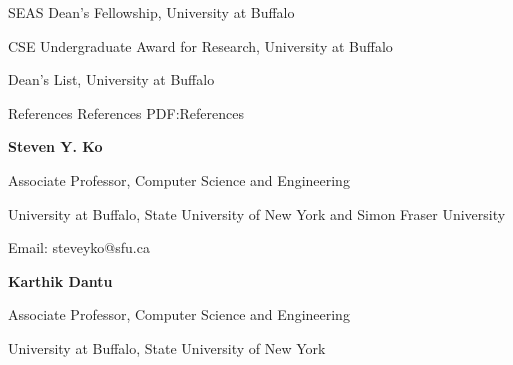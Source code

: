 \documentclass[letterpaper,MMMyyyy,nonstopmode]{simpleresumecv}
\begin{document}
\begin{Body}
\Gap
\BulletItem
SEAS Dean’s Fellowship, University at Buffalo
\hfill
{}
\vspace{0.5ex}



\Gap
\BulletItem
CSE Undergraduate Award for Research, University at Buffalo
\hfill
{}
\vspace{0.5ex}



\Gap
\BulletItem
Dean's List, University at Buffalo
\hfill
{}
\vspace{0ex}







\vspace{1ex}
\Section
{References}
{References}
{PDF:References}

\Entry
\textbf{Steven Y. Ko} 

\hspace{1ex}Associate Professor, Computer Science and Engineering

\hspace{1ex}University at Buffalo, State University of New York and Simon Fraser University

\hspace{1ex}Email: steveyko@sfu.ca

\vspace{0.5ex}

\Gap
\Entry
\textbf{Karthik Dantu}

\hspace{1ex}Associate Professor, Computer Science and Engineering

\hspace{1ex}University at Buffalo, State University of New York


\end{Body}
\end{document}
